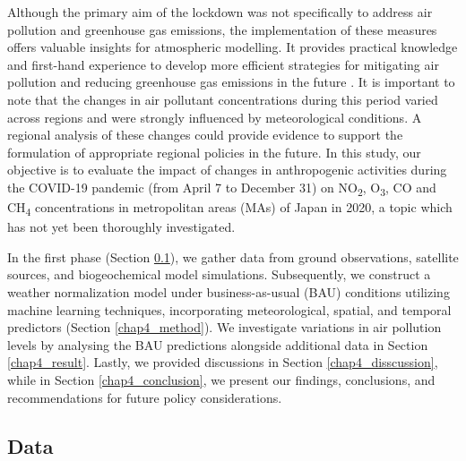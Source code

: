 Although the primary aim of the lockdown was not specifically to address air pollution and greenhouse gas emissions, the implementation of these measures offers valuable insights for atmospheric modelling. It provides practical knowledge and first-hand experience to develop more efficient strategies for mitigating air pollution and reducing greenhouse gas emissions in the future \citep{grange2021covid}. It is important to note that the changes in air pollutant concentrations during this period varied across regions and were strongly influenced by meteorological conditions. A regional analysis of these changes could provide evidence to support the formulation of appropriate regional policies in the future. In this study, our objective is to evaluate the impact of changes in anthropogenic activities during the COVID-19 pandemic (from April 7 to December 31) on NO\textsubscript{2}, O\textsubscript{3}, CO and CH\textsubscript{4} concentrations in metropolitan areas (MAs) of Japan in 2020, a topic which has not yet been thoroughly investigated. \par

In the first phase (Section \ref{chap4_data}), we gather data from ground observations, satellite sources, and biogeochemical model simulations. Subsequently, we construct a weather normalization model under business-as-usual (BAU) conditions utilizing machine learning techniques, incorporating meteorological, spatial, and temporal predictors (Section \ref{chap4_method}). We investigate variations in air pollution levels by analysing the BAU predictions alongside additional data in Section \ref{chap4_result}. Lastly, we provided discussions in Section \ref{chap4_disscussion}, while in Section \ref{chap4_conclusion}, we present our findings, conclusions, and recommendations for future policy considerations.\par

\subsection{Data} \label{chap4_data}

